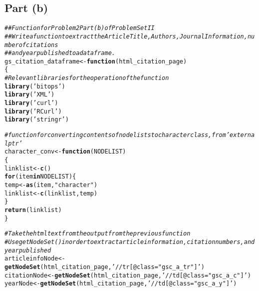 \documentclass{article}\usepackage[]{graphicx}\usepackage[]{color}
\makeatletter
\newcommand{\hlstr}[1]{\textcolor[rgb]{0.192,0.494,0.8}{#1}}%
\newcommand{\hlcom}[1]{\textcolor[rgb]{0.678,0.584,0.686}{\textit{#1}}}%
\newcommand{\hlstd}[1]{\textcolor[rgb]{0.345,0.345,0.345}{#1}}%
\newcommand{\hlkwa}[1]{\textcolor[rgb]{0.161,0.373,0.58}{\textbf{#1}}}%
\newcommand{\hlkwb}[1]{\textcolor[rgb]{0.69,0.353,0.396}{#1}}%
\newcommand{\hlkwc}[1]{\textcolor[rgb]{0.333,0.667,0.333}{#1}}%
\newcommand{\hlkwd}[1]{\textcolor[rgb]{0.737,0.353,0.396}{\textbf{#1}}}%
\newenvironment{kframe}{%
 \def\at@end@of@kframe{}%
 \ifinner\ifhmode%
  \def\at@end@of@kframe{\end{minipage}}%
  \begin{minipage}{\columnwidth}%
 \fi\fi%
 \def\FrameCommand##1{\hskip\@totalleftmargin \hskip-\fboxsep
 \colorbox{shadecolor}{##1}\hskip-\fboxsep
     \hskip-\linewidth \hskip-\@totalleftmargin \hskip\columnwidth}%
 \MakeFramed {\advance\hsize-\width
   \@totalleftmargin\z@ \linewidth\hsize
   \@setminipage}}%
 {\par\unskip\endMakeFramed%
 \at@end@of@kframe}
\newenvironment{knitrout}{}{} %
\makeatother
\begin{document}
\subsection{Part (b)}
\begin{knitrout}
\color{fgcolor}\begin{kframe}
\begin{alltt}
\hlcom{##Function for Problem 2 Part (b) of Problem Set II}
\hlcom{##Write a function to extract the Article Title, Authors, Journal Information, number of citations}
\hlcom{##and year published to a dataframe.}
\hlstd{gs_citation_dataframe}\hlkwb{<-}\hlkwa{function}\hlstd{(}\hlkwc{html_citation_page}\hlstd{)}
\hlstd{\{}
  \hlcom{#Relevant libraries for the operation of the function}
  \hlkwd{library}\hlstd{(}\hlstr{'bitops'}\hlstd{)}
  \hlkwd{library}\hlstd{(}\hlstr{'XML'}\hlstd{)}
  \hlkwd{library}\hlstd{(}\hlstr{'curl'}\hlstd{)}
  \hlkwd{library}\hlstd{(}\hlstr{'RCurl'}\hlstd{)}
  \hlkwd{library}\hlstd{(}\hlstr{'stringr'}\hlstd{)}

  \hlcom{#function for converting contents of node lists to character class, from 'externalptr'}
  \hlstd{character_conv}\hlkwb{<-}\hlkwa{function}\hlstd{(}\hlkwc{NODELIST}\hlstd{)}
  \hlstd{\{}
    \hlstd{linklist}\hlkwb{<-}\hlkwd{c}\hlstd{()}
    \hlkwa{for} \hlstd{(item} \hlkwa{in} \hlstd{NODELIST) \{}
      \hlstd{temp}\hlkwb{<-}\hlkwd{as}\hlstd{(item,} \hlstr{"character"}\hlstd{)}
      \hlstd{linklist}\hlkwb{<-}\hlkwd{c}\hlstd{(linklist, temp)}
    \hlstd{\}}
    \hlkwd{return}\hlstd{(linklist)}
  \hlstd{\}}

  \hlcom{#Take the html text from the output from the previous function}
  \hlcom{#Use getNodeSet() in order to extract article information, citation numbers, and year published}
  \hlstd{articleinfoNode}\hlkwb{<-}\hlkwd{getNodeSet}\hlstd{(html_citation_page,}\hlstr{'//tr[@class="gsc_a_tr"]'}\hlstd{)}
  \hlstd{citationNode}\hlkwb{<-}\hlkwd{getNodeSet}\hlstd{(html_citation_page,}\hlstr{'//td[@class="gsc_a_c"]'}\hlstd{)}
  \hlstd{yearNode}\hlkwb{<-}\hlkwd{getNodeSet}\hlstd{(html_citation_page,}\hlstr{'//td[@class="gsc_a_y"]'}\hlstd{)}


\end{alltt}
\end{kframe}
\end{knitrout}
\end{document}
